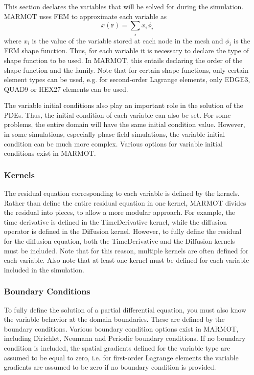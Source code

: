 \documentclass[letter,12pt,fleqn]{article}
\begin{document}
This section declares the variables that will be solved for during the simulation. MARMOT uses FEM to approximate each variable as
\begin{equation}
x(\mathbf{r}) = \sum_i x_i \phi_i
\end{equation}
where $x_i$ is the value of the variable stored at each node in the mesh and $\phi_i$ is the FEM shape function. Thus, for each variable it is necessary to declare the type of shape function to be used. In MARMOT, this entails declaring the order of the shape function and the family. Note that for certain shape functions, only certain element types can be used, e.g. for second-order Lagrange elements, only EDGE3, QUAD9 or HEX27 elements can be used.

The variable initial conditions also play an important role in the solution of the PDEs. Thus, the initial condition of each variable can also be set. For some problems, the entire domain will have the same initial condition value. However, in some simulations, especially phase field simulations, the variable initial condition can be much more complex. Various options for variable initial conditions exist in MARMOT.

\subsubsection{Kernels}

The residual equation corresponding to each variable is defined by the kernels. Rather than define the entire residual equation in one kernel, MARMOT divides the residual into pieces, to allow a more modular approach. For example, the time derivative is defined in the TimeDerivative kernel, while the diffusion operator is defined in the Diffusion kernel. However, to fully define the residual for the diffusion equation, both the TimeDerivative and the Diffusion kernels must be included. Note that for this reason, multiple kernels are often defined for each variable. Also note that at least one kernel must be defined for each variable included in the simulation.  

\subsubsection{Boundary Conditions}

To fully define the solution of a partial differential equation, you must also know the variable behavior at the domain boundaries. These are defined by the boundary conditions. Various boundary condition options exist in MARMOT, including Dirichlet, Neumann and Periodic boundary conditions. If no boundary condition is included, the spatial gradients defined for the variable type are assumed to be equal to zero, i.e. for first-order Lagrange elements the variable gradients are assumed to be zero if no boundary condition is provided.  
\end{document}
